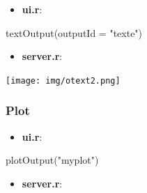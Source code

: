 \documentclass[
]{article}
\newenvironment{Shaded}{\begin{snugshade}}{\end{snugshade}}
\newcommand{\AttributeTok}[1]{\textcolor[rgb]{0.77,0.63,0.00}{#1}}
\newcommand{\FunctionTok}[1]{\textcolor[rgb]{0.00,0.00,0.00}{#1}}
\newcommand{\NormalTok}[1]{#1}
\newcommand{\OtherTok}[1]{\textcolor[rgb]{0.56,0.35,0.01}{#1}}
\newcommand{\SpecialCharTok}[1]{\textcolor[rgb]{0.00,0.00,0.00}{#1}}
\newcommand{\StringTok}[1]{\textcolor[rgb]{0.31,0.60,0.02}{#1}}
\providecommand{\tightlist}{%
  \setlength{\itemsep}{0pt}\setlength{\parskip}{0pt}}
\begin{document}
\begin{itemize}
\tightlist
\item
  \textbf{ui.r}:
\end{itemize}

\begin{Shaded}
\begin{Highlighting}[]
\FunctionTok{textOutput}\NormalTok{(}\AttributeTok{outputId =} \StringTok{"texte"}\NormalTok{)}
\end{Highlighting}
\end{Shaded}

\begin{itemize}
\tightlist
\item
  \textbf{server.r}:
\end{itemize}

\begin{Shaded}
\end{Shaded}

\texttt{[image: img/otext2.png]}

\hypertarget{plot}{%
\subsubsection{Plot}\label{plot}}

\begin{itemize}
\tightlist
\item
  \textbf{ui.r}:
\end{itemize}

\begin{Shaded}
\begin{Highlighting}[]
\FunctionTok{plotOutput}\NormalTok{(}\StringTok{"myplot"}\NormalTok{)}
\end{Highlighting}
\end{Shaded}

\begin{itemize}
\tightlist
\item
  \textbf{server.r}:
\end{itemize}

\begin{Shaded}
\end{Shaded}
\end{document}

